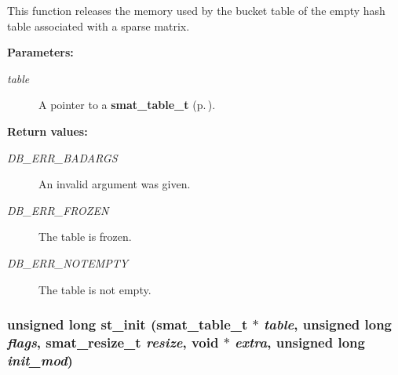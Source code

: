  This function releases the memory used by the bucket table of the empty hash table associated with a sparse matrix.\begin{Desc}
\item[{\bf Parameters: }]\par
\begin{description}
\item[
{\em table}]A pointer to a {\bf smat\_\-table\_\-t} {\rm (p.\,\pageref{group__dbprim__smat_a0})}.\end{description}
\end{Desc}
\begin{Desc}
\item[{\bf Return values: }]\par
\begin{description}
\item[
{\em DB\_\-ERR\_\-BADARGS}]An invalid argument was given. \item[
{\em DB\_\-ERR\_\-FROZEN}]The table is frozen. \item[
{\em DB\_\-ERR\_\-NOTEMPTY}]The table is not empty. \end{description}
\end{Desc}
\subsubsection{\setlength{\rightskip}{0pt plus 5cm}unsigned long st\_\-init ({\bf smat\_\-table\_\-t} $\ast$ {\em table}, unsigned long {\em flags}, {\bf smat\_\-resize\_\-t} {\em resize}, void $\ast$ {\em extra}, unsigned long {\em init\_\-mod})}\label{group__dbprim__smat_a9}


